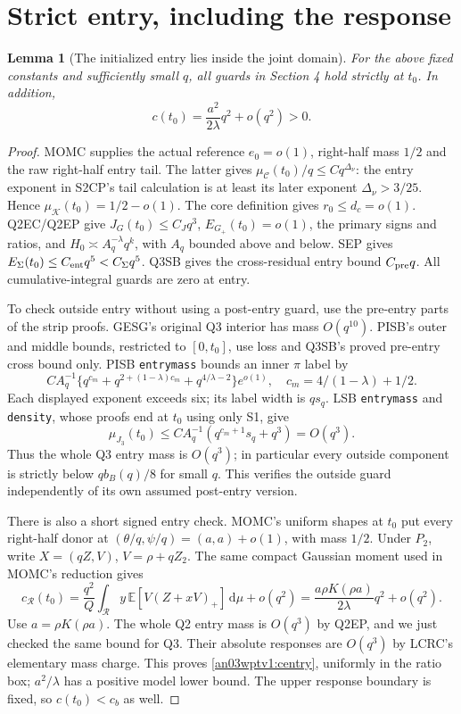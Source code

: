 \documentclass[11pt]{article}
\newtheorem{lemma}[theorem]{Lemma}
\theoremstyle{remark}\newtheorem{remark}[theorem]{Remark}
\newcommand{\dd}{\,\mathrm d}
\newcommand{\E}{\mathbb E}
\newcommand{\KK}{\mathcal K}
\newcommand{\Gp}{G_+}
\begin{document}
\section{Strict entry, including the response}
\begin{lemma}[The initialized entry lies inside the joint domain]
\label{an03wptv1:entry}
For the above fixed constants and sufficiently small $q$, all guards
in Section 4 hold strictly at $t_0$. In addition,
\begin{equation}
 c(t_0)=\frac{a^2}{2\lambda}q^2+o(q^2)>0.
 \label{an03wptv1:centry}
\end{equation}
\end{lemma}
\begin{proof}
MOMC supplies the actual reference $e_0=o(1)$, right-half mass
$1/2$ and the raw right-half entry tail. The latter gives
$\mu_{\mathcal C}(t_0)/q\le Cq^{\Delta_\nu}$: the entry exponent
in S2CP's tail calculation is at least its later exponent
$\Delta_\nu>3/25$. Hence $\mu_{\KK}(t_0)=1/2-o(1)$.
The core definition gives $r_0\le d_c=o(1)$.
Q2EC/Q2EP give $J_G(t_0)\le C_Jq^3$,
$E_{\Gp}(t_0)=o(1)$, the primary signs and ratios, and
$H_0\asymp A_q^{-\lambda}q^k$, with $A_q$ bounded above and below.
SEP gives $E_\Sigma(t_0)\le C_{\rm ent}q^5<C_\Sigma q^5$.
Q3SB gives the cross-residual entry bound $C_{\rm pre}q$.
All cumulative-integral guards are zero at entry.

To check outside entry without using a post-entry guard, use the
pre-entry parts of the strip proofs. GESG's original Q3 interior
has mass $O(q^{10})$. PISB's outer and middle bounds, restricted
to $[0,t_0]$, use loss and Q3SB's proved pre-entry cross bound only.
PISB \texttt{entrymass} bounds an inner $\pi$ label by
\[
 C A_q^{-1}\{q^{c_m}+q^{2+(1-\lambda)c_m}+q^{4/\lambda-2}\}e^{o(1)},
 \quad c_m=4/(1-\lambda)+1/2.
\]
Each displayed exponent exceeds six; its label width is $qs_q$.
LSB \texttt{entrymass} and \texttt{density}, whose proofs end at
$t_0$ using only S1, give
\[
 \mu_{J_3}(t_0)\le C A_q^{-1}(q^{c_m+1}s_q+q^3)=O(q^3).
\]
Thus the whole Q3 entry mass is $O(q^3)$; in particular every
outside component is strictly below $q b_B(q)/8$ for small $q$.
This verifies the outside guard independently of its own assumed
post-entry version.

There is also a short signed entry check. MOMC's uniform shapes
at $t_0$ put every right-half donor at
$(\theta/q,\psi/q)=(a,a)+o(1)$, with mass $1/2$.
Under $P_2$, write $X=(qZ,V)$, $V=\rho+qZ_2$.
The same compact Gaussian moment used in MOMC's reduction gives
\[
 c_{\mathcal R}(t_0)
 =\frac{q^2}{Q}\int_{\mathcal R}
 y\,\E[V(Z+xV)_+]\dd\mu+o(q^2)
 =\frac{a\rho K(\rho a)}{2\lambda}q^2+o(q^2).
\]
Use $a=\rho K(\rho a)$. The whole Q2 entry mass is $O(q^3)$
by Q2EP, and we just checked the same bound for Q3.
Their absolute responses are $O(q^3)$ by LCRC's elementary
mass charge. This proves \eqref{an03wptv1:centry}, uniformly in
the ratio box; $a^2/\lambda$ has a positive model lower bound.
The upper response boundary is fixed, so $c(t_0)<c_b$ as well.
\end{proof}
\end{document}
